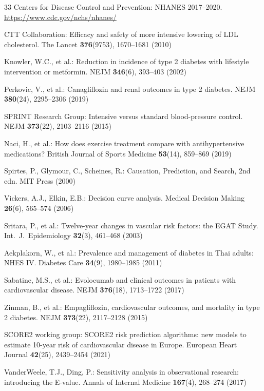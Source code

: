 \documentclass[runningheads]{llncs}
\begin{document}
\begin{thebibliography}{33}
Centers for Disease Control and Prevention:
NHANES 2017--2020.
\url{https://www.cdc.gov/nchs/nhanes/}

CTT Collaboration:
Efficacy and safety of more intensive lowering of LDL cholesterol.
The Lancet \textbf{376}(9753), 1670--1681 (2010)

Knowler, W.C., et al.:
Reduction in incidence of type 2 diabetes with lifestyle intervention or metformin.
NEJM \textbf{346}(6), 393--403 (2002)

Perkovic, V., et al.:
Canagliflozin and renal outcomes in type 2 diabetes.
NEJM \textbf{380}(24), 2295--2306 (2019)

SPRINT Research Group:
Intensive versus standard blood-pressure control.
NEJM \textbf{373}(22), 2103--2116 (2015)

Naci, H., et al.:
How does exercise treatment compare with antihypertensive medications?
British Journal of Sports Medicine \textbf{53}(14), 859--869 (2019)

Spirtes, P., Glymour, C., Scheines, R.:
Causation, Prediction, and Search, 2nd edn.
MIT Press (2000)

Vickers, A.J., Elkin, E.B.:
Decision curve analysis.
Medical Decision Making \textbf{26}(6), 565--574 (2006)

Sritara, P., et al.:
Twelve-year changes in vascular risk factors: the EGAT Study.
Int.\ J.\ Epidemiology \textbf{32}(3), 461--468 (2003)

Aekplakorn, W., et al.:
Prevalence and management of diabetes in Thai adults: NHES IV.
Diabetes Care \textbf{34}(9), 1980--1985 (2011)

Sabatine, M.S., et al.:
Evolocumab and clinical outcomes in patients with cardiovascular disease.
NEJM \textbf{376}(18), 1713--1722 (2017)

Zinman, B., et al.:
Empagliflozin, cardiovascular outcomes, and mortality in type 2 diabetes.
NEJM \textbf{373}(22), 2117--2128 (2015)

SCORE2 working group:
SCORE2 risk prediction algorithms: new models to estimate 10-year risk
of cardiovascular disease in Europe.
European Heart Journal \textbf{42}(25), 2439--2454 (2021)

VanderWeele, T.J., Ding, P.:
Sensitivity analysis in observational research: introducing the E-value.
Annals of Internal Medicine \textbf{167}(4), 268--274 (2017)


\end{thebibliography}
\end{document}
